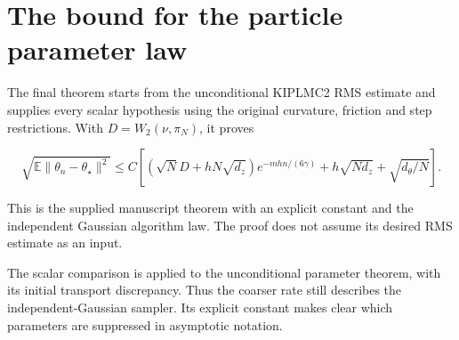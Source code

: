 \documentclass[11pt,a4paper]{article}
\begin{document}
\section{\texorpdfstring{The bound for the particle parameter law}{The bound for the particle parameter law}}


The final theorem starts from the unconditional KIPLMC2 RMS estimate and supplies every scalar hypothesis using the original curvature, friction and step restrictions. With \(D=W_2(\nu,\pi_N)\), it proves

\[\sqrt{\mathbb E\lVert\theta_n-\theta_\star\rVert^2}\le C\left[(\sqrt ND+hN\sqrt{d_z})e^{-mhn/(6\gamma)}+h\sqrt{Nd_z}+\sqrt{d_\theta/N}\right].\]

This is the supplied manuscript theorem with an explicit constant and the independent Gaussian algorithm law. The proof does not assume its desired RMS estimate as an input.



The scalar comparison is applied to the unconditional parameter theorem, with its initial transport discrepancy. Thus the coarser rate still describes the independent-Gaussian sampler. Its explicit constant makes clear which parameters are suppressed in asymptotic notation.
\end{document}
